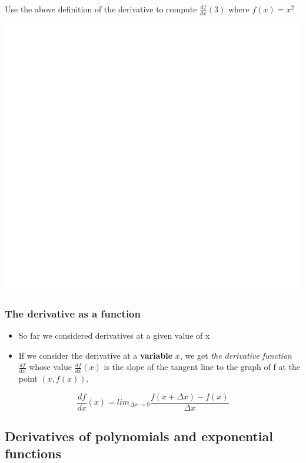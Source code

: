 \documentclass[]{book}
\begin{document}
Use the above definition of the derivative to compute \(\frac{df}{dx}(3)\) where \(f(x)=x^2\)

\begin{center}\includegraphics[width=1\linewidth]{figure/LB1-1} \end{center}

\hypertarget{the-derivative-as-a-function}{%
\subsubsection{The derivative as a function}\label{the-derivative-as-a-function}}

\begin{itemize}
\item
  So far we considered derivatives at a given value of x
\item
  If we consider the derivative at a \textbf{variable} \(x\), we get \emph{the derivative function} \(\frac{df}{dx}\) whose value \(\frac{df}{dx}(x)\) is the slope of the tangent line to the graph of f at the point \((x, f(x)).\)
\end{itemize}

\[\frac{df}{dx}(x) =lim_{\Delta x\to 0}\frac{f(x+\Delta x) -f(x)}{\Delta x}\]

\hypertarget{derivatives-of-polynomials-and-exponential-functions}{%
\subsection{Derivatives of polynomials and exponential functions}\label{derivatives-of-polynomials-and-exponential-functions}}
\end{document}
